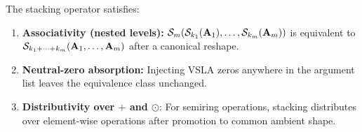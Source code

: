 \begin{theorem}
\label{thm:stacking-properties}
The stacking operator satisfies:
\begin{enumerate}
\item \textbf{Associativity (nested levels):} $\mathcal{S}_m(\mathcal{S}_{k_1}(\mathbf{A}_1), \dots, \mathcal{S}_{k_m}(\mathbf{A}_m))$ is equivalent to $\mathcal{S}_{k_1+\dots+k_m}(\mathbf{A}_1, \dots, \mathbf{A}_m)$ after a canonical reshape.
\item \textbf{Neutral-zero absorption:} Injecting VSLA zeros anywhere in the argument list leaves the equivalence class unchanged.
\item \textbf{Distributivity over $+$ and $\odot$}: For semiring operations, stacking distributes over element-wise operations after promotion to common ambient shape.
\end{enumerate}
\end{theorem}

